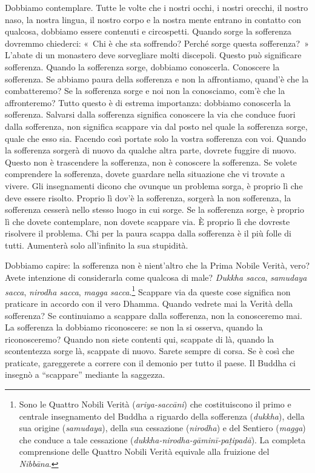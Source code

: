 Dobbiamo contemplare. Tutte le volte che i nostri occhi, i nostri
orecchi, il nostro naso, la nostra lingua, il nostro corpo e la nostra
mente entrano in contatto con qualcosa, dobbiamo essere contenuti e
circospetti. Quando sorge la sofferenza dovremmo chiederci: «~Chi è che
sta soffrendo? Perché sorge questa sofferenza?~» L'abate di un monastero
deve sorvegliare molti discepoli. Questo può significare sofferenza.
Quando la sofferenza sorge, dobbiamo conoscerla. Conoscere la
sofferenza. Se abbiamo paura della sofferenza e non la affrontiamo,
quand'è che la combatteremo? Se la sofferenza sorge e noi non la
conosciamo, com'è che la affronteremo? Tutto questo è di estrema
importanza: dobbiamo conoscerla la sofferenza. Salvarsi dalla sofferenza
significa conoscere la via che conduce fuori dalla sofferenza, non
significa scappare via dal posto nel quale la sofferenza sorge, quale
che esso sia. Facendo così portate solo la vostra sofferenza con voi.
Quando la sofferenza sorgerà di nuovo da qualche altra parte, dovrete
fuggire di nuovo. Questo non è trascendere la sofferenza, non è
conoscere la sofferenza. Se volete comprendere la sofferenza, dovete
guardare nella situazione che vi trovate a vivere. Gli insegnamenti
dicono che ovunque un problema sorga, è proprio lì che deve essere
risolto. Proprio lì dov'è la sofferenza, sorgerà la non sofferenza, la
sofferenza cesserà nello stesso luogo in cui sorge. Se la sofferenza
sorge, è proprio lì che dovete contemplare, non dovete scappare via. È
proprio lì che dovreste risolvere il problema. Chi per la paura scappa
dalla sofferenza è il più folle di tutti. Aumenterà solo all'infinito la
sua stupidità.

Dobbiamo capire: la sofferenza non è nient'altro che la Prima Nobile
Verità, vero? Avete intenzione di considerarla come qualcosa di male?
\emph{Dukkha sacca}, \emph{samudaya sacca}, \emph{nirodha sacca},
\emph{magga sacca}.\footnote{Sono le Quattro Nobili Verità
  (\emph{ariya-saccāni}) che costituiscono il primo e centrale
  insegnamento del Buddha a riguardo della sofferenza (\emph{dukkha}),
  della sua origine (\emph{samudaya}), della sua cessazione
  (\emph{nirodha}) e del Sentiero (\emph{magga}) che conduce a tale
  cessazione (\emph{dukkha-nirodha-gāminī-paṭipadā}). La completa
  comprensione delle Quattro Nobili Verità equivale alla fruizione del
  \emph{Nibbāna}.} Scappare via da queste cose significa non praticare
in accordo con il vero Dhamma. Quando vedrete mai la Verità della
sofferenza? Se continuiamo a scappare dalla sofferenza, non la
conosceremo mai. La sofferenza la dobbiamo riconoscere: se non la si
osserva, quando la riconosceremo? Quando non siete contenti qui,
scappate di là, quando la scontentezza sorge là, scappate di nuovo.
Sarete sempre di corsa. Se è così che praticate, gareggerete a correre
con il demonio per tutto il paese. Il Buddha ci insegnò a ``scappare''
mediante la saggezza.

